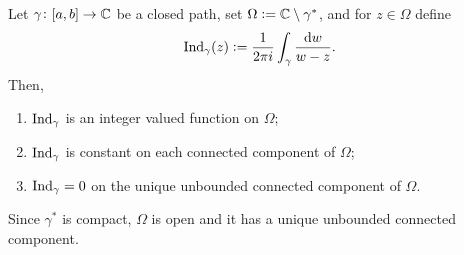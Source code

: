 \documentclass[11pt,a4paper]{article}
\begin{document}
\begin{theorem}
  \label{thm:index}
  Let $\gamma \colon [a,b] \to \mathbb{C}$ be a closed path,
  set $\Omega := \mathbb{C} \setminus \gamma^*$,
  and for $z \in \Omega$ define
  \[
    \operatorname{Ind}_{\gamma}(z) := \frac{1}{2 \pi i} \int_{\gamma} \frac{\mathrm{d} w}{w - z}.
  \]
  Then,
  \begin{enumerate}
    \item[(1)] $\operatorname{Ind}_{\gamma}$ is an integer valued function on $\Omega$;
    \item[(2)] $\operatorname{Ind}_{\gamma}$ is constant on each connected component of
      $\Omega$;
    \item[(3)] $\operatorname{Ind}_{\gamma} = 0$ on the unique unbounded connected component
      of $\Omega$.
  \end{enumerate}
\end{theorem}
\begin{remark}
  Since $\gamma^*$ is compact, $\Omega$ is open and it has a unique
  unbounded connected component.
\end{remark}
\end{document}
